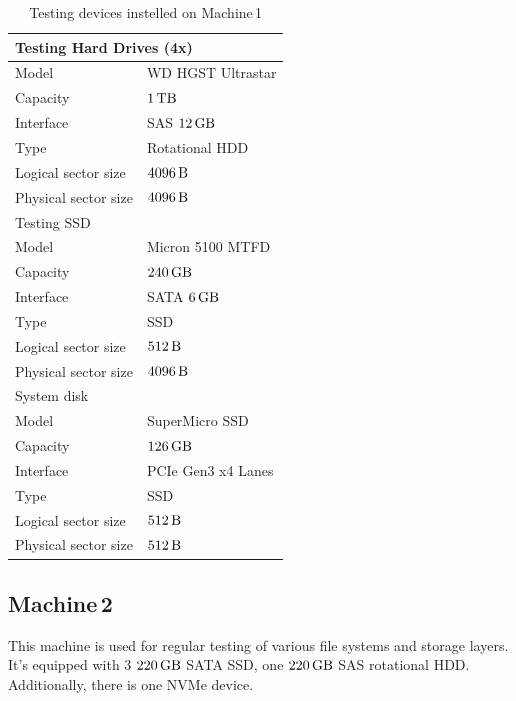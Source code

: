\documentclass[
  color, %
  table, %
  lof,   %
  lot,   %
]{fithesis3}
\begin{document}
\begin{table}
\centering
\begin{tabular}{|l|l|}
\hline
   \multicolumn{2}{|l|}{Testing Hard Drives (4x)} \\ \hline %
    Model & WD HGST Ultrastar\\
    \hline
    Capacity & $\SI{1}{\tera\byte}$  \\
    \hline
    Interface & SAS $\SI{12}{\giga\byte}$  \\
    \hline
    Type & Rotational HDD \\
    \hline    
    Logical sector size & $\SI{4096}{\byte}$ \\    
    \hline    
    Physical sector size & $\SI{4096}{\byte}$ \\
    \hline
    \hline
    \multicolumn{2}{|l|}{Testing SSD } \\ \hline %
     Model & Micron 5100 MTFD \\
    \hline
     Capacity & $\SI{240}{\giga\byte}$  \\
    \hline
    Interface & SATA $\SI{6}{\giga\byte}$  \\
    \hline
    Type & SSD \\
    \hline    
    Logical sector size & $\SI{512}{\byte}$ \\    
    \hline    
     Physical sector size & $\SI{4096}{\byte}$ \\
    \hline
    \hline
    \multicolumn{2}{|l|}{System disk} \\ \hline %
    Model & SuperMicro SSD  \\
    \hline
    Capacity & $\SI{126}{\giga\byte}$  \\
    \hline
    Interface & PCIe Gen3 x4 Lanes  \\
    \hline
    Type & SSD \\
    \hline    
   Logical sector size & $\SI{512}{\byte}$ \\    
    \hline    
    Physical sector size & $\SI{512}{\byte}$ \\
    \hline   
\end{tabular}
\caption{Testing devices instelled on Machine\,1}
\end{table}


\subsection{Machine\,2}
\label{hw:2}
This machine is used for regular testing of various file systems and storage layers. It's equipped with 3 $\SI{220}{\giga\byte}$ SATA SSD, one $\SI{220}{\giga\byte}$ SAS rotational HDD. Additionally, there is one NVMe device.
\end{document}
